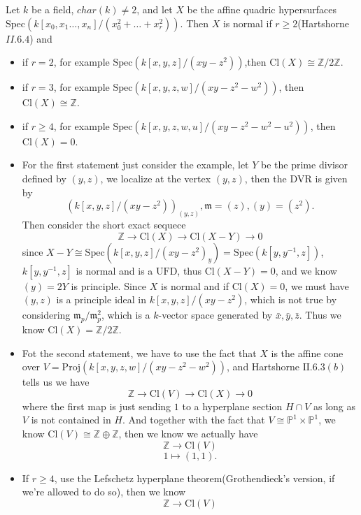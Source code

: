 \documentclass[../main.tex]{subfiles}
\begin{document}
\begin{example}
Let $k$ be a field, $char(k)\neq 2$, and let $X$ be the affine quadric hypersurfaces $\mathrm{Spec}(k[x_{0}, x_{1}\dots, x_{n}]/(x_{0}^{2}+\dots +x_{r}^{2}))$. Then $X$ is normal if $r\geq 2$(Hartshorne $II.6.4$) and  
\begin{itemize}
\item if $r=2$, for example $\mathrm{Spec}(k[x,y,z]/(xy-z^{2}))$,then $\mathrm{Cl}(X)\cong \mathbb{Z}/2\mathbb{Z}$.
\item if $r=3$, for example $\mathrm{Spec}(k[x,y,z,w]/(xy-z^{2}-w^{2}))$, then $\mathrm{Cl}(X)\cong \mathbb{Z}$.
\item if $r\geq 4$, for example $\mathrm{Spec}(k[x,y,z,w,u]/(xy-z^{2}-w^{2}-u^{2}))$, then $\mathrm{Cl}(X)=0$.
\end{itemize}
\begin{itemize}
\item For the first statement just consider the example, let $Y$ be the prime divisor defined by $(y,z)$, we localize at the vertex $(y,z)$, then the $\mathrm{DVR}$ is given by $$(k[x,y,z]/(xy-z^{2}))_{(y,z)},\mathfrak{m}=(z), (y)=(z^{2}).$$
Then consider the short exact sequece 
$$\mathbb{Z}\rightarrow \mathrm{Cl}(X)\rightarrow \mathrm{Cl}(X-Y)\rightarrow 0$$
since $X-Y\cong \mathrm{Spec}(k[x,y,z]/(xy-z^{2})_{y})=\mathrm{Spec}(k[y,y^{-1},z])$, $k[y,y^{-1},z]$ is normal and is a $\mathrm{UFD}$, thus $\mathrm{Cl}(X-Y)=0$, and we know $(y)=2Y$ is principle. Since $X$ is normal and if $\mathrm{Cl}(X)=0$, we must have $(y,z)$ is a principle ideal in $k[x,y,z]/(xy-z^{2})$, which is not true by considering $\mathfrak{m}_{p}/\mathfrak{m}_{p}^{2}$, which is a $k$-vector space generated by $\bar{x}, \bar{y},\bar{z}$. Thus we know $\mathrm{Cl}(X)=\mathbb{Z}/2\mathbb{Z}$.
\item Fot the second statement, we have to use the fact that $X$ is the affine cone over $V=\mathrm{Proj}(k[x,y,z,w]/(xy-z^{2}-w^{2}))$, and Hartshorne $\mathrm{II}.6.3(b)$ tells us we have 
$$\mathbb{Z}\rightarrow \mathrm{Cl}(V)\rightarrow \mathrm{Cl}(X)\rightarrow 0$$
where the first map is just sending $1$ to a hyperplane section $H\cap V$ as long as $V$ is not contained in $H$. And together with the fact that $V\cong \mathbb{P}^{1}\times \mathbb{P}^{1}$, we know $\mathrm{Cl}(V)\cong \mathbb{Z}\oplus \mathbb{Z}$, then we know we actually have 
$$\mathbb{Z}\rightarrow \mathrm{Cl}(V)$$
$$1\mapsto (1,1) .$$
\item If $r\geq 4$, use the Lefschetz hyperplane theorem(Grothendieck's version, if we're allowed to do so), then we know $$\mathbb{Z}\rightarrow \mathrm{Cl}(V)$$

\end{itemize}
\end{example}
\end{document}
